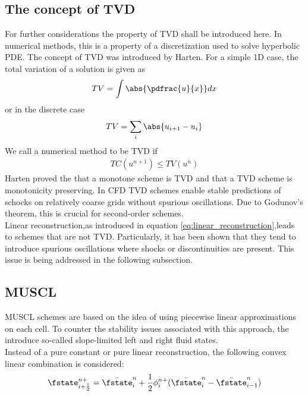 \documentclass[../main.tex]{subfiles}
\begin{document}
\subsection{The concept of \acf{TVD}}\label{sec:TVD}
For further considerations the property of \acf{TVD} shall be introduced here. In numerical methods, this is a property of a discretization used to solve hyperbolic \ac{PDE}. The concept of \ac{TVD} was introduced by Harten\cite{Harten1983}.
For a simple 1D case, the total variation of a solution is given as
\begin{align}
TV=\int\abs{\pdfrac{u}{x}} dx
\end{align}
or in the discrete case
\begin{align}
TV=\sum_i \abs{u_{i+1}-u_i}
\end{align}
We call a numerical method to be \ac{TVD} if
\begin{align}
TC(u^{n+1})\leq TV(u^n)
\end{align}
Harten proved the that a monotone scheme is \ac{TVD} and that a \ac{TVD} scheme is monotonicity preserving. In \ac{CFD} \ac{TVD} schemes enable stable predictions of schocks on relatively coarse grids without spurious oscillations. Due to Godunov's theorem, this is crucial for second-order schemes.\\


Linear reconstruction,as introduced in equation \eqref{eq:linear_reconstruction},leads to schemes that are not \ac{TVD}. Particularly, it has been shown that they tend to introduce spurious oscillations where shocks or discontinuities are present. This issue is being addressed in the following subsection.



\subsection{\acf{MUSCL}}\label{sec:muscl}
\acf{MUSCL} schemes are based on the idea of using piecewise linear approximations on each cell. To counter the stability issues associated with this approach, the introduce so-called slope-limited left and right fluid states.\\
Instead of a pure constant or pure linear reconstruction, the following convex linear combination is considered:
\begin{align}
\fstate_{i+\frac{1}{2}}^{n+} = \bar{\fstate}_i^n +\frac{1}{2}\phi_i^{n+}(\bar{\fstate}_i^n-\bar{\fstate}_{i-1}^n)
\end{align}
\end{document}
